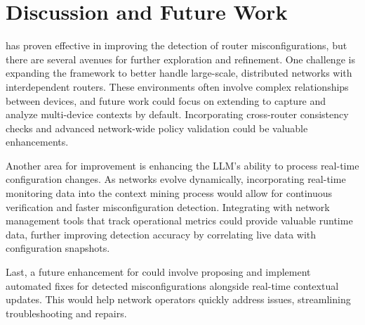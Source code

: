 \section{Discussion and Future Work}
\label{sec:future}

\sysname{} has proven effective in improving the detection of router misconfigurations, but there are several avenues for further exploration and refinement. One challenge is expanding the framework to better handle large-scale, distributed networks with interdependent routers. These environments often involve complex relationships between devices, and future work could focus on extending \sysname{} to capture and analyze multi-device contexts by default. Incorporating cross-router consistency checks and advanced network-wide policy validation could be valuable enhancements.

Another area for improvement is enhancing the LLM's ability to process real-time configuration changes. As networks evolve dynamically, incorporating real-time monitoring data into the context mining process would allow for continuous verification and faster misconfiguration detection. Integrating \sysname{} with network management tools that track operational metrics could provide valuable runtime data, further improving detection accuracy by correlating live data with configuration snapshots.

Last, a future enhancement for \sysname{} could involve proposing and implement automated fixes for detected misconfigurations alongside real-time contextual updates. This would help network operators quickly address issues, streamlining troubleshooting and repairs.